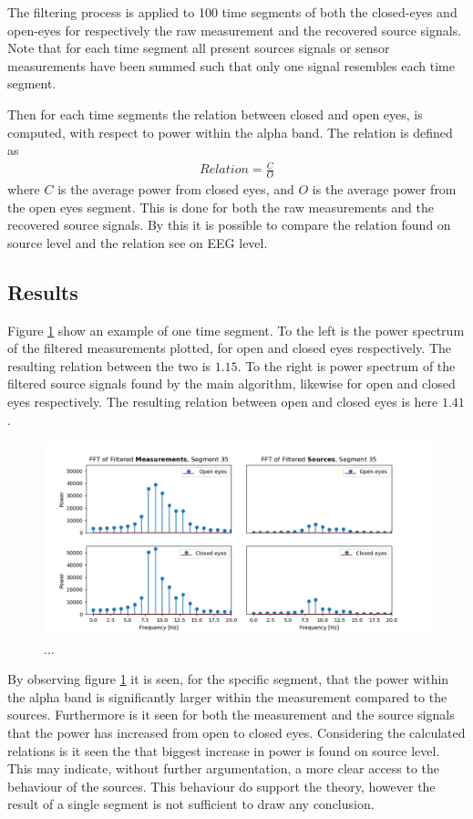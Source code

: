 The filtering process is applied to 100 time segments of both the closed-eyes and open-eyes for respectively the raw measurement and the recovered source signals.    
Note that for each time segment all present sources signals or sensor measurements have been summed such that only one signal resembles each time segment.

Then for each time segments the relation between closed and open eyes, is computed, with respect to power within the alpha band. The relation is defined as 
\begin{align*}
Relation = \frac{C}{O} 
\end{align*}
where $C$ is the average power from closed eyes, and $O$ is the average power from the open eyes segment. 
This is done for both the raw measurements and the recovered source signals. By this it is possible to compare the relation found on source level and the relation see on EEG level.  

\subsection{Results}
Figure \ref{fig:dft_2} show an example of one time segment. To the left is the power spectrum of the filtered measurements plotted, for open and closed eyes respectively. The resulting relation between the two is $1.15$. To the right is power spectrum of the filtered source signals found by the main algorithm, likewise for open and closed eyes respectively. The resulting relation between open and closed eyes is here $1.41$.  
\begin{figure}[H]
\centering
\includegraphics[scale=0.5]{figures/ch_7/FFT_plot.png}
\caption{...}
\label{fig:dft_2}
\end{figure}
\noindent
By observing figure \ref{fig:dft_2} it is seen, for the specific segment, that the power within the alpha band is significantly larger within the measurement compared to the sources. Furthermore is it seen for both the measurement and the source signals that the power has increased from open to closed eyes. Considering the calculated relations is it seen the that biggest increase in power is found on source level. This may indicate, without further argumentation, a more clear access to the behaviour of the sources.  
This behaviour do support the theory, however the result of a single segment is not sufficient to draw any conclusion.          

